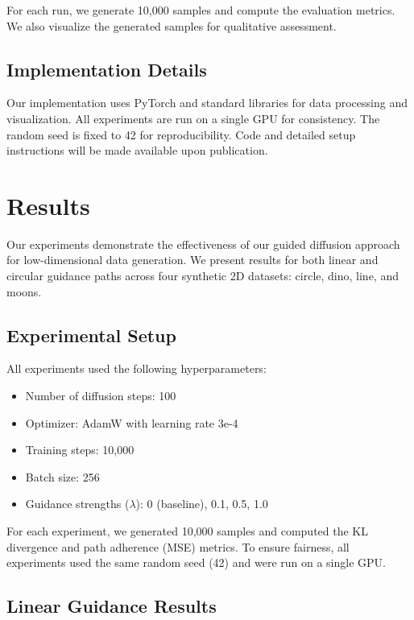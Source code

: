 \documentclass{article} %
\begin{document}
For each run, we generate 10,000 samples and compute the evaluation metrics. We also visualize the generated samples for qualitative assessment.

\subsection{Implementation Details}

Our implementation uses PyTorch and standard libraries for data processing and visualization. All experiments are run on a single GPU for consistency. The random seed is fixed to 42 for reproducibility. Code and detailed setup instructions will be made available upon publication.

\section{Results}
\label{sec:results}

Our experiments demonstrate the effectiveness of our guided diffusion approach for low-dimensional data generation. We present results for both linear and circular guidance paths across four synthetic 2D datasets: circle, dino, line, and moons.

\subsection{Experimental Setup}

All experiments used the following hyperparameters:
\begin{itemize}
    \item Number of diffusion steps: 100
    \item Optimizer: AdamW with learning rate 3e-4
    \item Training steps: 10,000
    \item Batch size: 256
    \item Guidance strengths ($\lambda$): 0 (baseline), 0.1, 0.5, 1.0
\end{itemize}

For each experiment, we generated 10,000 samples and computed the KL divergence and path adherence (MSE) metrics. To ensure fairness, all experiments used the same random seed (42) and were run on a single GPU.

\subsection{Linear Guidance Results}
\end{document}
